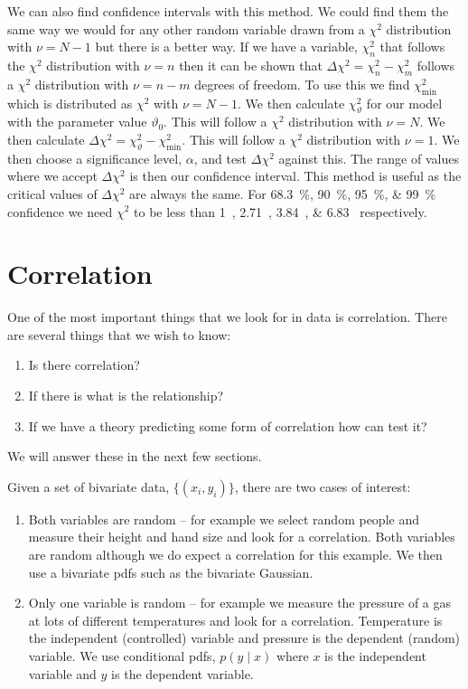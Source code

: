 \documentclass[a4paper]{article}
\newcommand{\st}{\mid}
\begin{document}
    We can also find confidence intervals with this method.
    We could find them the same way we would for any other random variable drawn from a \(\chi^2\) distribution with \(\nu = N - 1\) but there is a better way.
    If we have a variable, \(\chi^2_n\) that follows the \(\chi^2\) distribution with \(\nu = n\) then it can be shown that \(\Delta\chi^2 = \chi^2_n - \chi^2_m\) follows a \(\chi^2\) distribution with \(\nu = n - m\) degrees of freedom.
    To use this we find \(\chi^2_{\min}\) which is distributed as \(\chi^2\) with \(\nu = N - 1\).
    We then calculate \(\chi^2_\vartheta\) for our model with the parameter value \(\vartheta_0\).
    This will follow a \(\chi^2\) distribution with \(\nu = N\).
    We then calculate \(\Delta\chi^2 = \chi^2_\vartheta - \chi^2_{\min}\).
    This will follow a \(\chi^2\) distribution with \(\nu = 1\).
    We then choose a significance level, \(\alpha\), and test \(\Delta\chi^2\) against this.
    The range of values where we accept \(\Delta\chi^2\) is then our confidence interval.
    This method is useful as the critical values of \(\Delta\chi^2\) are always the same.
    For \SIlist{68.3;90;95;99}{\percent} confidence we need \(\chi^2\) to be less than \SIlist{1;2.71;3.84;6.83}{} respectively.
    
    \section{Correlation}
    One of the most important things that we look for in data is correlation.
    There are several things that we wish to know:
    \begin{enumerate}
        \item Is there correlation?
        \item If there is what is the relationship?
        \item If we have a theory predicting some form of correlation how can test it?
    \end{enumerate}
    We will answer these in the next few sections.
    
    Given a set of bivariate data, \(\{(x_i, y_i)\}\), there are two cases of interest:
    \begin{enumerate}
        \item Both variables are random -- for example we select random people and measure their height and hand size and look for a correlation.
        Both variables are random although we do expect a correlation for this example.
        We then use a bivariate \glspl{pdf} such as the bivariate Gaussian.
        \item Only one variable is random -- for example we measure the pressure of a gas at lots of different temperatures and look for a correlation.
        Temperature is the independent (controlled) variable and pressure is the dependent (random) variable.
        We use conditional \glspl{pdf}, \(p(y\st x)\) where \(x\) is the independent variable and \(y\) is the dependent variable.
    \end{enumerate}
    
\end{document}
